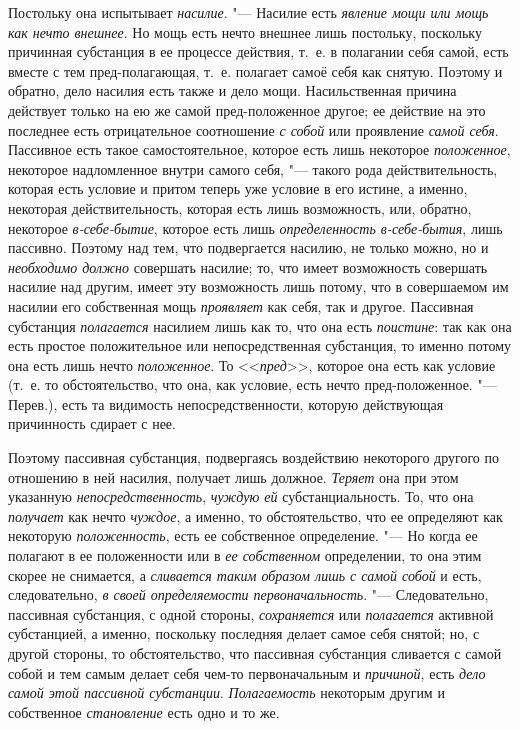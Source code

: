 Постольку она испытывает {\em насилие}. "--- Насилие есть
{\em явление мощи или мощь как нечто внешнее}. Но мощь
есть нечто внешнее лишь постольку, поскольку причинная субстанция в ее
процессе действия, т.~е. в полагании себя самой, есть вместе с тем
пред-полагающая, т.~е. полагает самоё себя как снятую. Поэтому и обратно,
дело насилия есть также и дело мощи. Насильственная причина действует
только на ею же самой пред-положенное другое; ее действие на это последнее
есть отрицательное соотношение {\em с собой} или
проявление {\em самой себя}. Пассивное есть такое
самостоятельное, которое есть лишь некоторое
{\em положенное}, некоторое надломленное внутри самого
себя, "--- такого рода действительность, которая есть условие и притом теперь
уже условие в его истине, а именно, некоторая действительность, которая
есть лишь возможность, или, обратно, некоторое
{\em в-себе-бытие}, которое есть лишь
{\em определенность в-себе-бытия}, лишь пассивно.
Поэтому над тем, что подвергается насилию, не только можно, но и
{\em необходимо должно} совершать насилие; то, что
имеет возможность совершать насилие над другим, имеет эту возможность лишь
потому, что в совершаемом им насилии его собственная мощь
{\em проявляет} как себя, так и другое. Пассивная
субстанция {\em полагается} насилием лишь как то, что
она есть {\em поистине}: так как она есть простое
положительное или непосредственная субстанция, то именно потому она есть
лишь нечто {\em положенное}. То
<<{\em пред}>>, которое она есть как условие (т.~е. то
обстоятельство, что она, как условие, есть нечто пред-положенное. "---
Перев.), есть та видимость непосредственности, которую действующая
причинность сдирает с нее.

Поэтому пассивная субстанция, подвергаясь воздействию некоторого другого по
отношению в ней насилия, получает лишь должное.
{\em Теряет} она при этом указанную {\em непосредственность},
{\em чуждую ей} субстанциальность. То, что она {\em получает} как нечто
{\em чуждое}, а именно, то обстоятельство, что ее
определяют как некоторую {\em положенность}, есть ее
собственное определение. "--- Но когда ее полагают в ее положенности или в
{\em ее собственном} определении, то она этим скорее не
снимается, а {\em сливается таким образом лишь с самой
собой} и есть, следовательно, {\em в своей
определяемости первоначальность}. "--- Следовательно, пассивная субстанция, с
одной стороны, {\em сохраняется} или
{\em полагается} активной субстанцией, а именно,
поскольку последняя делает самое себя снятой; но, с другой стороны, то
обстоятельство, что пассивная субстанция сливается с самой собой и тем
самым делает себя чем-то первоначальным и {\em причиной}, есть {\em дело
самой этой пассивной субстанции}. {\em Полагаемость} некоторым другим и
собственное {\em становление} есть одно и то же.

